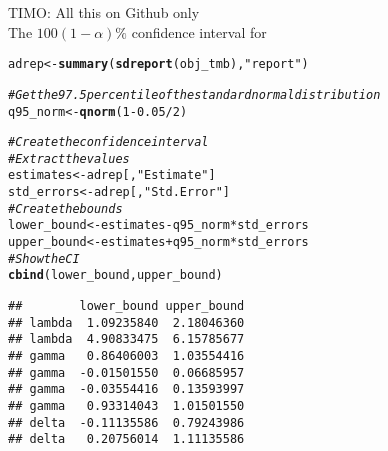 \documentclass[bimj,fleqn]{w-art}\usepackage[]{graphicx}\usepackage[]{color}
\makeatletter
\newcommand{\hlnum}[1]{\textcolor[rgb]{0.686,0.059,0.569}{#1}}%
\newcommand{\hlstr}[1]{\textcolor[rgb]{0.192,0.494,0.8}{#1}}%
\newcommand{\hlcom}[1]{\textcolor[rgb]{0.678,0.584,0.686}{\textit{#1}}}%
\newcommand{\hlopt}[1]{\textcolor[rgb]{0,0,0}{#1}}%
\newcommand{\hlstd}[1]{\textcolor[rgb]{0.345,0.345,0.345}{#1}}%
\newcommand{\hlkwb}[1]{\textcolor[rgb]{0.69,0.353,0.396}{#1}}%
\newcommand{\hlkwd}[1]{\textcolor[rgb]{0.737,0.353,0.396}{\textbf{#1}}}%
\newenvironment{kframe}{%
 \def\at@end@of@kframe{}%
 \ifinner\ifhmode%
  \def\at@end@of@kframe{\end{minipage}}%
  \begin{minipage}{\columnwidth}%
 \fi\fi%
 \def\FrameCommand##1{\hskip\@totalleftmargin \hskip-\fboxsep
 \colorbox{shadecolor}{##1}\hskip-\fboxsep
     \hskip-\linewidth \hskip-\@totalleftmargin \hskip\columnwidth}%
 \MakeFramed {\advance\hsize-\width
   \@totalleftmargin\z@ \linewidth\hsize
   \@setminipage}}%
 {\par\unskip\endMakeFramed%
 \at@end@of@kframe}
\newenvironment{knitrout}{}{} %
\theoremstyle{plain}
\theoremstyle{definition}
\makeatother
\begin{document}

\bigskip

TIMO: All this on Github only\\

The $100(1-\alpha)\%$ confidence interval for
\begin{knitrout}
\color{fgcolor}\begin{kframe}
\begin{alltt}
\hlstd{adrep} \hlkwb{<-} \hlkwd{summary}\hlstd{(}\hlkwd{sdreport}\hlstd{(obj_tmb),} \hlstr{"report"}\hlstd{)}

\hlcom{# Get the 97.5 percentile of the standard normal distribution}
\hlstd{q95_norm} \hlkwb{<-} \hlkwd{qnorm}\hlstd{(}\hlnum{1} \hlopt{-} \hlnum{0.05} \hlopt{/} \hlnum{2}\hlstd{)}

\hlcom{# Create the confidence interval}
\hlcom{# Extract the values}
\hlstd{estimates} \hlkwb{<-} \hlstd{adrep[,} \hlstr{"Estimate"}\hlstd{]}
\hlstd{std_errors} \hlkwb{<-} \hlstd{adrep[,} \hlstr{"Std. Error"}\hlstd{]}
\hlcom{# Create the bounds}
\hlstd{lower_bound} \hlkwb{<-} \hlstd{estimates} \hlopt{-} \hlstd{q95_norm} \hlopt{*} \hlstd{std_errors}
\hlstd{upper_bound} \hlkwb{<-} \hlstd{estimates} \hlopt{+} \hlstd{q95_norm} \hlopt{*} \hlstd{std_errors}
\hlcom{# Show the CI}
\hlkwd{cbind}\hlstd{(lower_bound, upper_bound)}
\end{alltt}
\begin{verbatim}
##        lower_bound upper_bound
## lambda  1.09235840  2.18046360
## lambda  4.90833475  6.15785677
## gamma   0.86406003  1.03554416
## gamma  -0.01501550  0.06685957
## gamma  -0.03554416  0.13593997
## gamma   0.93314043  1.01501550
## delta  -0.11135586  0.79243986
## delta   0.20756014  1.11135586
\end{verbatim}
\end{kframe}
\end{knitrout}

\end{document}
